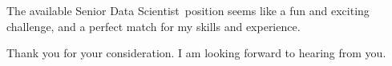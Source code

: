 \documentclass[11pt, letterpaper]{awesome-cv}
\newcommand{\openPosition}{Senior Data Scientist}
\begin{document}
\begin{cvletter}

The available \openPosition~position seems like a fun and exciting challenge, and a perfect match for my skills and experience.

Thank you for your consideration. I am looking forward to hearing from you.


\end{cvletter}


\makeletterclosing
\end{document}
